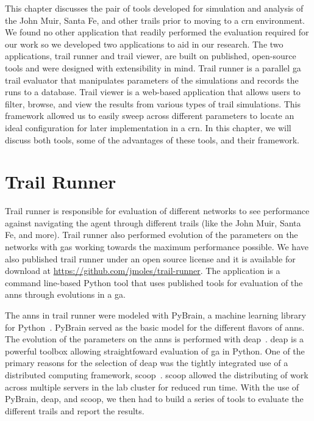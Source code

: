 This chapter discusses the pair of tools developed for simulation and analysis of the John Muir, Santa Fe, and other trails prior to moving to a \gls{crn} environment. We found no other application that readily performed the evaluation required for our work so we developed two applications to aid in our research. The two applications, trail runner and trail viewer, are built on published, open-source tools and were designed with extensibility in mind.  Trail runner is a parallel \gls{ga} trail evaluator that manipulates parameters of the simulations and records the runs to a database. Trail viewer is a web-based application that allows users to filter, browse, and view the results from various types of trail simulations. This framework allowed us to easily sweep across different parameters to locate an ideal configuration for later implementation in a \gls{crn}. In this chapter, we will discuss both tools, some of the advantages of these tools, and their framework.

\section{Trail Runner}
Trail runner is responsible for evaluation of different networks to see performance against navigating the agent through different trails (like the John Muir, Santa Fe, and more). Trail runner also performed evolution of the parameters on the networks with \glspl{ga} working towards the maximum performance possible. We have also published trail runner under an open source license and it is available for download at \url{https://github.com/jmoles/trail-runner}. The application is a command line-based Python tool that uses published tools for evaluation of the \glspl{ann} through evolutions in a \gls{ga}.

The \glspl{ann} in trail runner were modeled with PyBrain, a machine learning library for Python~\cite{Schaul2010-tu}. PyBrain served as the basic model for the different flavors of \glspl{ann}. The evolution of the parameters on the \glspl{ann} is performed with \gls{deap}~\cite{Fortin2012-yv}. \gls{deap} is a powerful toolbox allowing straightfoward evaluation of \gls{ga} in Python. One of the primary reasons for the selection of \gls{deap} was the tightly integrated use of a distributed computing framework, \gls{scoop}~\cite{Hold-Geoffroy2014-qf}. \gls{scoop} allowed the distributing of work across multiple servers in the lab cluster for reduced run time. With the use of PyBrain, \gls{deap}, and \gls{scoop}, we then had to build a series of tools to evaluate the different trails and report the results.

